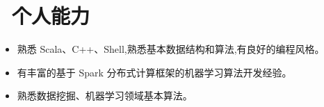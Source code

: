 \documentclass{resume}
\begin{document}
\vspace{-1ex}

\section{\faCogs\ 个人能力}
\begin{itemize}[parsep=0.5ex]
  \item 熟悉 Scala、C++、Shell,熟悉基本数据结构和算法,有良好的编程风格。
  \item 有丰富的基于 Spark 分布式计算框架的机器学习算法开发经验。
  \item 熟悉数据挖掘、机器学习领域基本算法。
\end{itemize}


%
%
\end{document}
